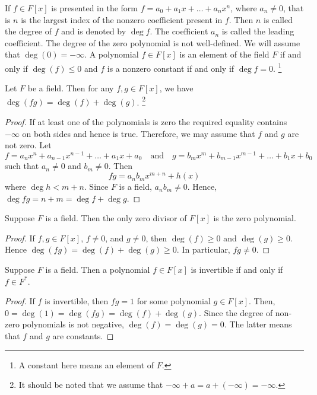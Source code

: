If $f\in F[x]$ is presented in the form $f = a_0 + a_1 x + \ldots + a_n x^n$, where $a_n \neq 0$, that is $n$ is the largest index of the nonzero coefficient present in $f$.
Then $n$ is called the degree of $f$ and is denoted by $\deg f$.
The coefficient $a_n$ is called the leading coefficient.
The degree of the zero polynomial is not well-defined.
We will assume that $\deg (0) = -\infty$.
A polynomial $f\in F[x]$ is an element of the field $F$ if and only if $\deg (f) \leqslant 0$ and $f$ is a nonzero constant if and only if $\deg f = 0$.%
\footnote{A constant here means an element of $F$.}

\begin{claim}
\label{claim::Degree}
Let $F$ be a field.
Then for any $f, g \in F[x]$, we have $\deg(fg) = \deg (f) + \deg(g)$.%
\footnote{It should be noted that we assume that $-\infty + a = a + (-\infty) = -\infty$.}
\end{claim}
\begin{proof}
If at least one of the polynomials is zero the required equality contains $-\infty$ on both sides and hence is true.
Therefore, we may assume that $f$ and $g$ are not zero.
Let 
\[
f = a_n x^n + a_{n-1}x^{n-1} + \ldots + a_1 x + a_0\quad \text{and} \quad g = b_mx^m + b_{m-1}x^{m-1} + \ldots + b_1 x + b_0
\]
such that $a_n\neq 0$ and $b_m\neq0$.
Then 
\[
fg = a_n b_m x^{m+n} + h(x)
\]
where $\deg h < m + n$.
Since $F$ is a field, $a_n b_m \neq 0$.
Hence, $\deg fg = n + m = \deg f + \deg g$.
\end{proof}

\begin{claim}
\label{claim::PolyZeroDiv}
Suppose $F$ is a field.
Then the only zero divisor of $F[x]$ is the zero polynomial.
\end{claim}
\begin{proof}
If $f, g\in F[x]$, $f\neq 0$, and $g\neq 0$, then $\deg(f) \geqslant 0$ and $\deg(g) \geqslant 0$.
Hence $\deg(fg) = \deg(f) + \deg(g)\geqslant 0$.
In particular, $fg \neq 0$.
\end{proof}

\begin{claim}
\label{claim::PolyInvert}
Suppose $F$ is a field.
Then a polynomial $f\in F[x]$ is invertible if and only if $f\in F^*$.
\end{claim}
\begin{proof}
If $f$ is invertible, then $fg = 1$ for some polynomial $g\in F[x]$.
Then, $0 = \deg(1) = \deg(fg) = \deg(f) + \deg(g)$.
Since the degree of non-zero polynomials is not negative, $\deg(f) = \deg(g) = 0$.
The latter means that $f$ and $g$ are constants.
\end{proof}


